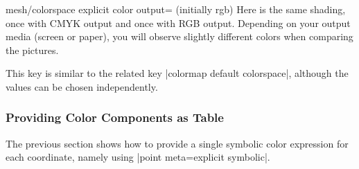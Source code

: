 {{\begin{pgfplotskey}{%
    mesh/colorspace explicit color output= (initially rgb)%
}
    Here is the same shading, once with CMYK output and once with RGB output.
    Depending on your output media (screen or paper), you will observe slightly
    different colors when comparing the pictures.
\begin{codeexample}[]
\end{codeexample}

\begin{codeexample}[]
\end{codeexample}

    This key is similar to the related key |colormap default colorspace|,
    although the values can be chosen independently.
\end{pgfplotskey}


\subsubsection{Providing Color Components as Table}

The previous section shows how to provide a single symbolic color expression
for each coordinate, namely using |point meta=explicit symbolic|.

}}
